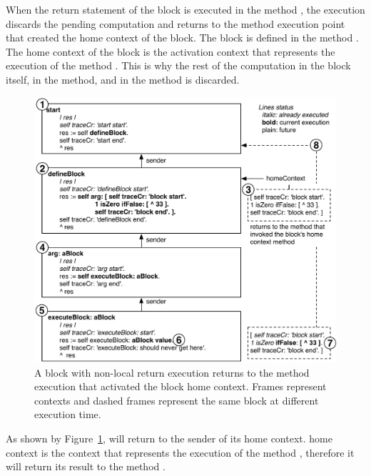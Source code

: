 \documentclass[a4paper,10pt,twoside]{book}
\begin{document}
When the return statement of the block is executed in the method , the execution discards the pending computation and returns to the method execution point that created the home context of the block. The block is defined in  the method . The home context of the block is the activation context that represents the execution of the method . This is why the rest of the computation in the block itself, in the  method, and in the  method is discarded.

\begin{figure}
\begin{center}\includegraphics[width=\textwidth]{nonLocalReturn2}
\caption{A block with non-local return execution returns to the method execution that activated the block home context. Frames represent contexts and dashed frames represent the same block at different execution time.\label{nonLocalReturn}}
\end{center}
\end{figure}

As shown by Figure~\ref{nonLocalReturn}, \ct{[^33]} will return to the sender of its home context. \ct{[^33]} home context is the context that represents the execution of the method , therefore it will return its result to the method .
\end{document}
